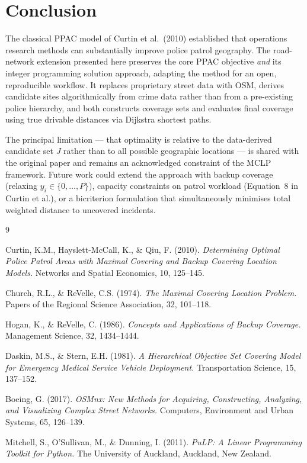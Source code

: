 \documentclass[12pt]{article}
\begin{document}
\section{Conclusion}

The classical PPAC model of Curtin et al.\ (2010) established that operations
research methods can substantially improve police patrol geography.  The
road-network extension presented here preserves the core PPAC objective
\emph{and} its integer programming solution approach, adapting the method for
an open, reproducible workflow.  It replaces proprietary street data with OSM,
derives candidate sites algorithmically from crime data rather than from a
pre-existing police hierarchy, and both constructs coverage sets and evaluates
final coverage using true drivable distances via Dijkstra shortest paths.

The principal limitation --- that optimality is relative to the data-derived
candidate set $J$ rather than to all possible geographic locations --- is shared
with the original paper and remains an acknowledged constraint of the MCLP
framework.  Future work could extend the approach with backup coverage
(relaxing $y_i \in \{0,\dots,P\}$), capacity constraints on patrol workload
(Equation~8 in Curtin et al.), or a bicriterion formulation that simultaneously
minimises total weighted distance to uncovered incidents.

\begin{thebibliography}{9}

Curtin, K.M., Hayslett-McCall, K., \& Qiu, F. (2010).
\textit{Determining Optimal Police Patrol Areas with Maximal Covering and
Backup Covering Location Models.}
Networks and Spatial Economics, 10, 125--145.

Church, R.L., \& ReVelle, C.S. (1974).
\textit{The Maximal Covering Location Problem.}
Papers of the Regional Science Association, 32, 101--118.

Hogan, K., \& ReVelle, C. (1986).
\textit{Concepts and Applications of Backup Coverage.}
Management Science, 32, 1434--1444.

Daskin, M.S., \& Stern, E.H. (1981).
\textit{A Hierarchical Objective Set Covering Model for Emergency Medical
Service Vehicle Deployment.}
Transportation Science, 15, 137--152.

Boeing, G. (2017).
\textit{OSMnx: New Methods for Acquiring, Constructing, Analyzing, and
Visualizing Complex Street Networks.}
Computers, Environment and Urban Systems, 65, 126--139.

Mitchell, S., O'Sullivan, M., \& Dunning, I. (2011).
\textit{PuLP: A Linear Programming Toolkit for Python.}
The University of Auckland, Auckland, New Zealand.

\end{thebibliography}
\end{document}
